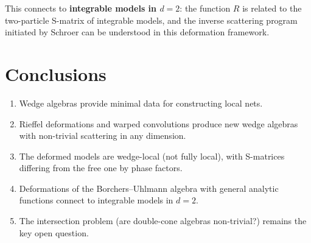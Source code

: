 \documentclass[11pt,a4paper]{article}
\begin{document}
This connects to \textbf{integrable models in $d=2$}: the function $R$
is related to the two-particle S-matrix of integrable models, and the
inverse scattering program initiated by Schroer can be understood in this
deformation framework.

\section{Conclusions}

\begin{enumerate}[nosep]
  \item Wedge algebras provide minimal data for constructing local nets.
  \item Rieffel deformations and warped convolutions produce new wedge
        algebras with non-trivial scattering in any dimension.
  \item The deformed models are wedge-local (not fully local), with
        S-matrices differing from the free one by phase factors.
  \item Deformations of the Borchers--Uhlmann algebra with general
        analytic functions connect to integrable models in $d=2$.
  \item The intersection problem (are double-cone algebras non-trivial?)
        remains the key open question.
\end{enumerate}
\end{document}
